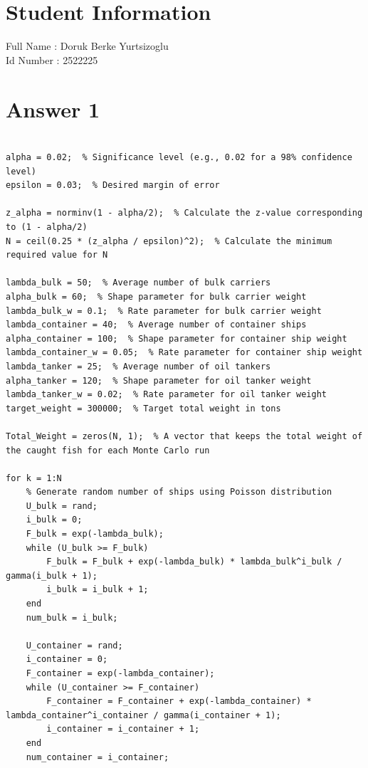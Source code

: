 \documentclass[12pt]{article}
\begin{document}
\section*{Student Information } 
Full Name : Doruk Berke Yurtsizoglu \\
Id Number :  2522225\\

\section*{Answer 1}


\begin{lstlisting}[style=Matlab-editor]
%my code

alpha = 0.02;  % Significance level (e.g., 0.02 for a 98% confidence level)
epsilon = 0.03;  % Desired margin of error

z_alpha = norminv(1 - alpha/2);  % Calculate the z-value corresponding to (1 - alpha/2)
N = ceil(0.25 * (z_alpha / epsilon)^2);  % Calculate the minimum required value for N

lambda_bulk = 50;  % Average number of bulk carriers
alpha_bulk = 60;  % Shape parameter for bulk carrier weight
lambda_bulk_w = 0.1;  % Rate parameter for bulk carrier weight
lambda_container = 40;  % Average number of container ships
alpha_container = 100;  % Shape parameter for container ship weight
lambda_container_w = 0.05;  % Rate parameter for container ship weight
lambda_tanker = 25;  % Average number of oil tankers
alpha_tanker = 120;  % Shape parameter for oil tanker weight
lambda_tanker_w = 0.02;  % Rate parameter for oil tanker weight
target_weight = 300000;  % Target total weight in tons

Total_Weight = zeros(N, 1);  % A vector that keeps the total weight of the caught fish for each Monte Carlo run

for k = 1:N
    % Generate random number of ships using Poisson distribution
    U_bulk = rand;
    i_bulk = 0;
    F_bulk = exp(-lambda_bulk);
    while (U_bulk >= F_bulk)
        F_bulk = F_bulk + exp(-lambda_bulk) * lambda_bulk^i_bulk / gamma(i_bulk + 1);
        i_bulk = i_bulk + 1;
    end
    num_bulk = i_bulk;
    
    U_container = rand;
    i_container = 0;
    F_container = exp(-lambda_container);
    while (U_container >= F_container)
        F_container = F_container + exp(-lambda_container) * lambda_container^i_container / gamma(i_container + 1);
        i_container = i_container + 1;
    end
    num_container = i_container;
    

\end{lstlisting}
\end{document}
